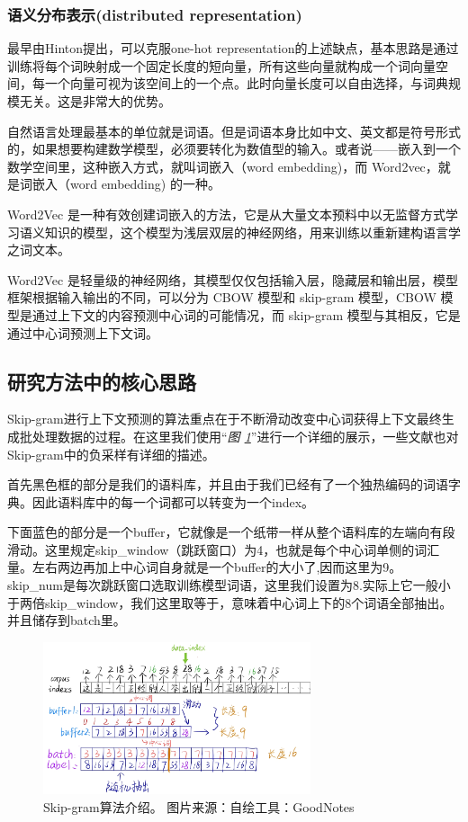 \documentclass{article}
\begin{document}
\subsubsection{语义分布表示(distributed representation)}
最早由Hinton提出，可以克服one-hot representation的上述缺点，基本思路是通过训练将每个词映射成一个固定长度的短向量，所有这些向量就构成一个词向量空间，每一个向量可视为该空间上的一个点。此时向量长度可以自由选择，与词典规模无关。这是非常大的优势。\par
自然语言处理最基本的单位就是词语。但是词语本身比如中文、英文都是符号形式的，如果想要构建数学模型，必须要转化为数值型的输入。或者说——嵌入到一个数学空间里，这种嵌入方式，就叫词嵌入（word embedding)，而 Word2vec，就是词嵌入（word embedding) 的一种。\par
Word2Vec 是一种有效创建词嵌入的方法，它是从大量文本预料中以无监督方式学习语义知识的模型，这个模型为浅层双层的神经网络，用来训练以重新建构语言学之词文本。\par
Word2Vec 是轻量级的神经网络，其模型仅仅包括输入层，隐藏层和输出层，模型框架根据输入输出的不同，可以分为 CBOW 模型和 skip-gram 模型，CBOW 模型是通过上下文的内容预测中心词的可能情况，而 skip-gram 模型与其相反，它是通过中心词预测上下文词\cite{2013Efficient}。\par

\subsection{研究方法中的核心思路}
Skip-gram进行上下文预测的算法重点在于不断滑动改变中心词获得上下文最终生成批处理数据的过程。在这里我们使用“{\it 图 \ref{fig:example2}}”进行一个详细的展示，一些文献也对Skip-gram中的负采样有详细的描述\cite{2014word2vec}。\par
首先黑色框的部分是我们的语料库，并且由于我们已经有了一个独热编码的词语字典。因此语料库中的每一个词都可以转变为一个index。\par
下面蓝色的部分是一个buffer，它就像是一个纸带一样从整个语料库的左端向有段滑动。这里规定skip\_window（跳跃窗口）为4，也就是每个中心词单侧的词汇量。左右两边再加上中心词自身就是一个buffer的大小了,因而这里为9。
skip\_num是每次跳跃窗口选取训练模型词语，这里我们设置为8.实际上它一般小于两倍skip\_window，我们这里取等于，意味着中心词上下的8个词语全部抽出。并且储存到batch里。
\begin{figure}[H]
    \centering
    \includegraphics[width=0.7\textwidth]{figure/algorism.png}
    \caption{Skip-gram算法介绍。 图片来源：自绘\quad 工具：GoodNotes }
    \label{fig:example2}
\end{figure}
\end{document}

